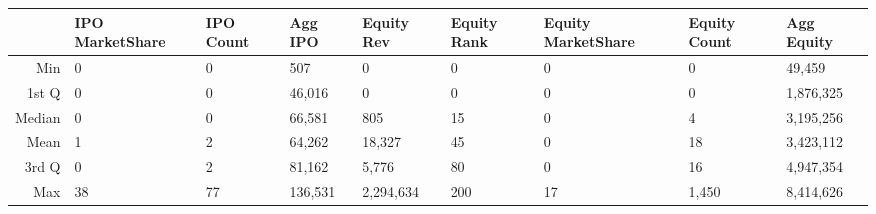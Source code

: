 \begin{table}[ht]
\centering
\begin{tabular}{rllllllll}
  \hline
 & IPO MarketShare & IPO Count & Agg IPO  & Equity Rev & Equity  Rank & Equity MarketShare & Equity Count & Agg Equity  \\ 
  \hline
Min & 0 & 0 & 507 & 0 & 0 & 0 & 0 & 49,459 \\ 
  1st Q & 0 & 0 & 46,016 & 0 & 0 & 0 & 0 & 1,876,325 \\ 
  Median & 0 & 0 & 66,581 & 805 & 15 & 0 & 4 & 3,195,256 \\ 
  Mean & 1 & 2 & 64,262 & 18,327 & 45 & 0 & 18 & 3,423,112 \\ 
  3rd Q & 0 & 2 & 81,162 & 5,776 & 80 & 0 & 16 & 4,947,354 \\ 
  Max & 38 & 77 & 136,531 & 2,294,634 & 200 & 17 & 1,450 & 8,414,626 \\ 
   \hline
\end{tabular}
\end{table}
